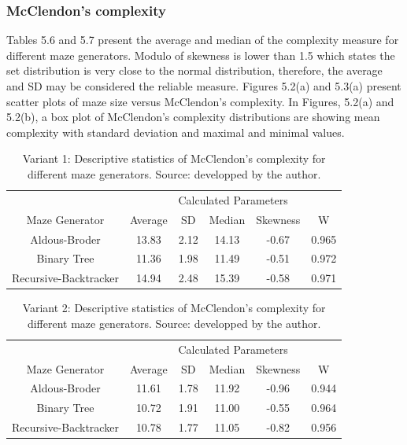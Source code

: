 \subsubsection{McClendon's complexity}
Tables 5.6 and 5.7 present the average and median of the complexity measure for different maze generators. Modulo of skewness is lower than 1.5 which states the set
distribution is very close to the normal distribution, therefore, the average and SD may be considered the reliable measure. Figures 5.2(a) and 5.3(a) present scatter
plots of maze size versus McClendon's complexity. In Figures, 5.2(a) and 5.2(b), a box plot of McClendon's complexity distributions are showing
mean complexity with standard deviation and maximal and minimal values.\\
\begin{table}[!ht]
    \centering
    \caption{Variant 1: Descriptive statistics of McClendon's complexity for different maze generators. Source: developped by the author.} 
    \begin{tabular}{c c c c c c}
    \hline
        ~&\multicolumn{5}{c}{Calculated Parameters}\\
        Maze Generator & Average & SD & Median & Skewness & W  \\ \hline\hline
        Aldous-Broder & 13.83 & 2.12 & 14.13 & -0.67 & 0.965  \\ 
        Binary Tree  & 11.36 & 1.98 & 11.49 & -0.51 & 0.972 \\ 
        Recursive-Backtracker  & 14.94 & 2.48 & 15.39 & -0.58 & 0.971 \\ \hline
    \end{tabular}
\end{table}  

\begin{table}[!ht]
    \centering
    \caption{Variant 2: Descriptive statistics of McClendon's complexity for different maze generators. Source: developped by the author.} 
    \begin{tabular}{c c c c c c}
    \hline
        ~&\multicolumn{5}{c}{Calculated Parameters}\\
        Maze Generator & Average & SD & Median & Skewness & W  \\ \hline\hline
        Aldous-Broder & 11.61 & 1.78 & 11.92 & -0.96 & 0.944  \\ 
        Binary Tree & 10.72 & 1.91 & 11.00 & -0.55 & 0.964  \\ 
        Recursive-Backtracker & 10.78 & 1.77 & 11.05 & -0.82 & 0.956  \\ \hline
    \end{tabular}
\end{table}

